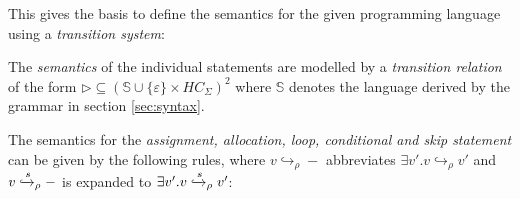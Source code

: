 	This gives the basis to define the semantics for the given programming
	language using a \emph{transition system}:
	\begin{definition}
		The \emph{semantics} of the individual statements are modelled by a
		\emph{transition relation} of the form
		$\rhd \subseteq
		(\mathbb{S}\cup\{\varepsilon\} \times \mathit{HC}_{\Sigma})^{2}$ where
		$\mathbb{S}$ denotes the language derived by the grammar in
		section \ref{sec:syntax}.
	\end{definition}
	The semantics for the \emph{assignment, allocation, loop, conditional
	and skip statement} can be given by the following rules, where
	$v\hookrightarrow_{\rho} -$ abbreviates
	$\exists v'.v\hookrightarrow_{\rho} v'$ and $v\xhookrightarrow{s}_{\rho} -$
	is expanded to $\exists v'.v\xhookrightarrow{s}_{\rho} v'$:
